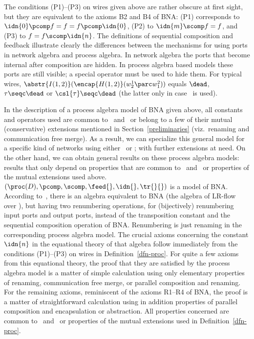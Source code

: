 \documentclass[fleqn]{llncs}
\begin{document}
The conditions (P1)--(P3) on wires given above are rather obscure at 
first sight, but they are equivalent to the axioms B2 and B4 of BNA:
(P1) corresponds to $\idn{0} \pcomp f = f = f \pcomp \idn{0}$,
(P2) to $\idn{m} \scomp f = f$, and (P3) to $f = f \scomp \idn{n}$.
The definitions of sequential composition and feedback illustrate
clearly the differences between the mechanisms for using ports in
network algebra and process algebra.
In network algebra the ports that become internal after composition are
hidden.
In process algebra based models these ports are still visible; a special
operator must be used to hide them.
For typical wires, $\abstr{I(1,2)}(\encap{H(1,2)}(w^1_2 \parc w^2_1))$
equals $\dead$, $\tau \seqc \dead$ or $\csl{\tau} \seqc \dead$ (the
latter only in case \acpdrtt\ is used).

In the description of a process algebra model of BNA given above, all
constants and operators used are common to \acpt\ and \acpdrtt\ or
belong to a few of their mutual (conservative) extensions mentioned in
Section~\ref{preliminaries} (viz.\ renaming and communication free
merge).
As a result, we can specialize this general model for a specific kind
of networks using either \acpt\ or \acpdrtt; with further extensions at
need.
On the other hand, we can obtain general results on these process
algebra models: results that only depend on properties that are common
to \acpt\ and \acpdrtt\ or properties of the mutual extensions used
above.
\bthm
\label{thm-proc}
$(\proc(D),\pcomp,\scomp,\feed{},\idn{},\tr{}{})$ is a model of BNA.
\ethm
\bproof
According to~\cite{Ste94}, there is an algebra equivalent to BNA (the
algebra of LR-flow over \Bi), but having two renumbering operations,
for (bijectively) renumbering input ports and output ports, instead of
the transposition constant and the sequential composition operation of
BNA.
Renumbering is just renaming in the corresponding process algebra model.
The crucial axioms concerning the constant $\idn{n}$ in the equational
theory of that algebra follow immediately from the conditions (P1)--(P3)
on wires in Definition~\ref{dfn-proc}.
For quite a few axioms from this equational theory, the proof that they
are satisfied by the process algebra model is a matter of simple
calculation using only elementary properties of renaming, communication
free merge, or parallel composition and renaming.
For the remaining axioms, reminiscent of the axioms R1--R4 of BNA, the
proof is a matter of straightforward calculation using in addition
properties of parallel composition and encapsulation or abstraction.
All properties concerned are common to \acpt\ and \acpdrtt\ or
properties of the mutual extensions used in Definition~\ref{dfn-proc}.
\eproof
\end{document}
